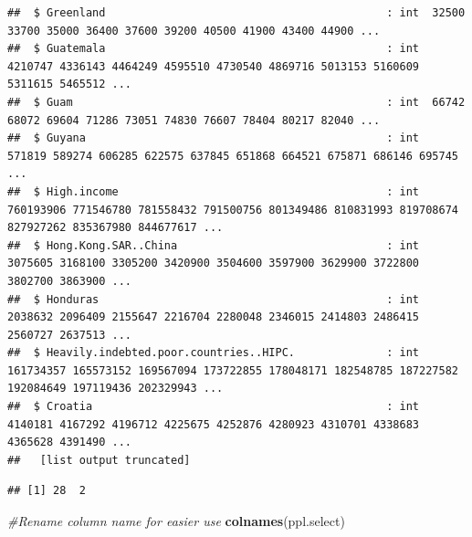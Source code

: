 \documentclass[12pt,]{article}
\newenvironment{Shaded}{\begin{snugshade}}{\end{snugshade}}
\newcommand{\KeywordTok}[1]{\textcolor[rgb]{0.13,0.29,0.53}{\textbf{#1}}}
\newcommand{\DecValTok}[1]{\textcolor[rgb]{0.00,0.00,0.81}{#1}}
\newcommand{\StringTok}[1]{\textcolor[rgb]{0.31,0.60,0.02}{#1}}
\newcommand{\CommentTok}[1]{\textcolor[rgb]{0.56,0.35,0.01}{\textit{#1}}}
\newcommand{\OperatorTok}[1]{\textcolor[rgb]{0.81,0.36,0.00}{\textbf{#1}}}
\newcommand{\NormalTok}[1]{#1}
\begin{document}
\begin{verbatim}
##  $ Greenland                                           : int  32500 33700 35000 36400 37600 39200 40500 41900 43400 44900 ...
##  $ Guatemala                                           : int  4210747 4336143 4464249 4595510 4730540 4869716 5013153 5160609 5311615 5465512 ...
##  $ Guam                                                : int  66742 68072 69604 71286 73051 74830 76607 78404 80217 82040 ...
##  $ Guyana                                              : int  571819 589274 606285 622575 637845 651868 664521 675871 686146 695745 ...
##  $ High.income                                         : int  760193906 771546780 781558432 791500756 801349486 810831993 819708674 827927262 835367980 844677617 ...
##  $ Hong.Kong.SAR..China                                : int  3075605 3168100 3305200 3420900 3504600 3597900 3629900 3722800 3802700 3863900 ...
##  $ Honduras                                            : int  2038632 2096409 2155647 2216704 2280048 2346015 2414803 2486415 2560727 2637513 ...
##  $ Heavily.indebted.poor.countries..HIPC.              : int  161734357 165573152 169567094 173722855 178048171 182548785 187227582 192084649 197119436 202329943 ...
##  $ Croatia                                             : int  4140181 4167292 4196712 4225675 4252876 4280923 4310701 4338683 4365628 4391490 ...
##   [list output truncated]
\end{verbatim}

\begin{Shaded}
\end{Shaded}

\begin{verbatim}
## [1] 28  2
\end{verbatim}

\begin{Shaded}
\begin{Highlighting}[]
\CommentTok{#Rename column name for easier use}
\KeywordTok{colnames}\NormalTok{(ppl.select)}
\end{Highlighting}
\end{Shaded}
\end{document}

